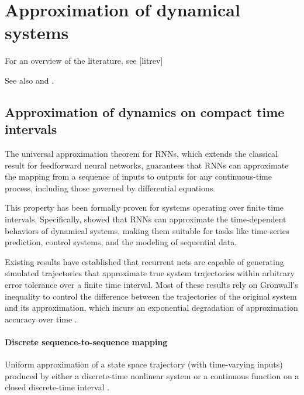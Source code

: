 \documentclass{article}
\theoremstyle{definition}
\theoremstyle{remark}
\begin{document}
\section{Approximation of dynamical systems}
For an overview of the literature, see [litrev]

See also \citep{li2022approximation} and \citep{jiang2023brief}.



\subsection{Approximation of dynamics on compact time intervals}

The universal approximation theorem for RNNs, which extends the classical result for feedforward neural networks, guarantees that RNNs can approximate the mapping from a sequence of inputs to outputs for any continuous-time process, including those governed by differential equations.

This property has been formally proven for systems operating over finite time intervals. Specifically, \citet{funahashi1993approximation} showed that RNNs can approximate the time-dependent behaviors of dynamical systems, making them suitable for tasks like time-series prediction, control systems, and the modeling of sequential data.


Existing results have established that recurrent nets are capable of generating simulated trajectories that approximate true system trajectories within arbitrary error tolerance over a finite time interval.
Most of these results rely on Gr\:onwall’s inequality to control the difference between the trajectories of the original system and its approximation, which incurs an exponential degradation of approximation accuracy over time
\citep{sontag1992neural, sontag1998learning, funahashi1993approximation,chow2000modeling, li2005approximation}.

\paragraph{Discrete sequence-to-sequence mapping}

Uniform approximation of a state space trajectory (with time-varying inputs) produced by either a discrete-time nonlinear system or a continuous function on a closed discrete-time interval \citep{jin1995universal}.
\end{document}
